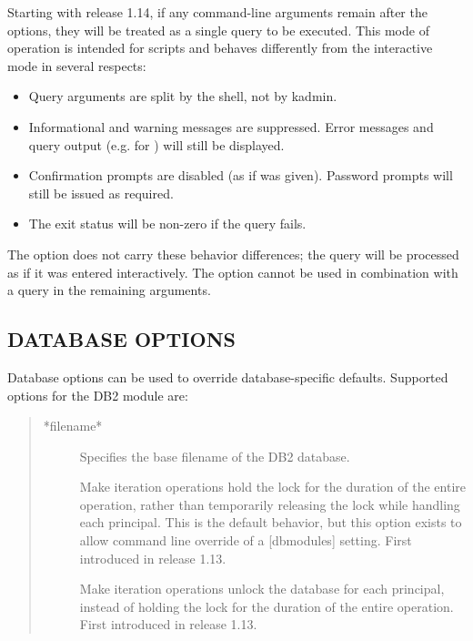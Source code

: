 \documentclass[letterpaper,10pt,english]{sphinxmanual}
\begin{document}
Starting with release 1.14, if any command-line arguments remain after
the options, they will be treated as a single query to be executed.
This mode of operation is intended for scripts and behaves differently
from the interactive mode in several respects:
\begin{itemize}
\item {} 
Query arguments are split by the shell, not by kadmin.

\item {} 
Informational and warning messages are suppressed.  Error messages
and query output (e.g. for ) will still be
displayed.

\item {} 
Confirmation prompts are disabled (as if  was given).
Password prompts will still be issued as required.

\item {} 
The exit status will be non-zero if the query fails.

\end{itemize}

The  option does not carry these behavior differences; the query
will be processed as if it was entered interactively.  The 
option cannot be used in combination with a query in the remaining
arguments.


\subsection{DATABASE OPTIONS}
\label{\detokenize{admin/admin_commands/kadmin_local:database-options}}\label{\detokenize{admin/admin_commands/kadmin_local:dboptions}}
Database options can be used to override database-specific defaults.
Supported options for the DB2 module are:
\begin{quote}
\begin{description}
\item[{*filename*}] \leavevmode
Specifies the base filename of the DB2 database.

\item[{}] \leavevmode
Make iteration operations hold the lock for the duration of
the entire operation, rather than temporarily releasing the
lock while handling each principal.  This is the default
behavior, but this option exists to allow command line
override of a {[}dbmodules{]} setting.  First introduced in
release 1.13.

\item[{}] \leavevmode
Make iteration operations unlock the database for each
principal, instead of holding the lock for the duration of the
entire operation.  First introduced in release 1.13.

\end{description}
\end{quote}
\end{document}

